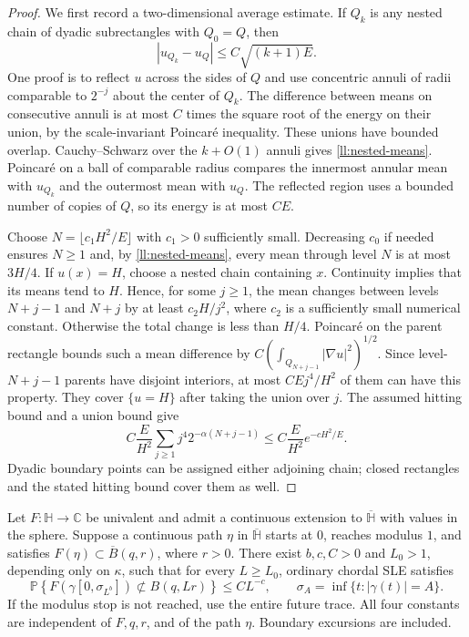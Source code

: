 \begin{proof}
We first record a two-dimensional average estimate. If $Q_k$ is
any nested chain of dyadic subrectangles with $Q_0=Q$, then
\begin{equation}
 |u_{Q_k}-u_Q|\le C\sqrt{(k+1)E}.
 \label{ll:nested-means}
\end{equation}
One proof is to reflect $u$ across the sides of $Q$ and use
concentric annuli of radii comparable to $2^{-j}$ about the center
of $Q_k$. The difference between means on consecutive annuli is
at most $C$ times the square root of the energy on their union,
by the scale-invariant Poincar\'e inequality. These unions have
bounded overlap. Cauchy--Schwarz over the $k+O(1)$ annuli gives
\eqref{ll:nested-means}. Poincar\'e on a ball of comparable radius
compares the innermost annular mean with $u_{Q_k}$ and the outermost
mean with $u_Q$. The reflected region uses a bounded number of
copies of $Q$, so its energy is at most $CE$.

Choose $N=\lfloor c_1H^2/E\rfloor$ with $c_1>0$ sufficiently small.
Decreasing $c_0$ if needed ensures $N\ge1$ and, by
\eqref{ll:nested-means}, every mean through level $N$ is at most
$3H/4$. If $u(x)=H$, choose a nested chain containing $x$.
Continuity implies that its means tend to $H$. Hence, for some
$j\ge1$, the mean changes between levels $N+j-1$ and $N+j$ by at
least $c_2H/j^2$, where $c_2$ is a sufficiently small numerical
constant. Otherwise the total change is less than $H/4$.
Poincar\'e on the parent rectangle bounds such a mean difference
by $C(\int_{Q_{N+j-1}}|\nabla u|^2)^{1/2}$.
Since level-$N+j-1$ parents have disjoint interiors, at most
$CEj^4/H^2$ of them can have this property.
They cover $\{u=H\}$ after taking the union over $j$.
The assumed hitting bound and a union bound give
\[
 C\frac E{H^2}\sum_{j\ge1}j^4
                   2^{-\alpha(N+j-1)}
 \le C\frac E{H^2}e^{-cH^2/E}.
\]
Dyadic boundary points can be assigned either adjoining chain; closed
rectangles and the stated hitting bound cover them as well.
\end{proof}

\begin{proposition}\label{ll:localization}
Let $F:\mathbb H\to\mathbb C$ be univalent and admit a continuous
extension to $\overline{\mathbb H}$ with values in the sphere.
Suppose a continuous path $\eta$ in $\overline{\mathbb H}$ starts
at $0$, reaches modulus $1$, and satisfies
$F(\eta)\subset\overline B(q,r)$, where $r>0$.
There exist $b,c,C>0$ and $L_0>1$, depending only on $\kappa$, such
that for every $L\ge L_0$,
ordinary chordal SLE satisfies
\[
 \mathbb P\left\{F(\gamma[0,\sigma_{L^b}])
                      \not\subset B(q,Lr)\right\}
       \le CL^{-c},
 \qquad
 \sigma_A=\inf\{t:|\gamma(t)|=A\}.
\]
If the modulus stop is not reached, use the entire future trace.
All four constants are independent of $F,q,r$, and of the path $\eta$.
Boundary excursions are included.
\end{proposition}

